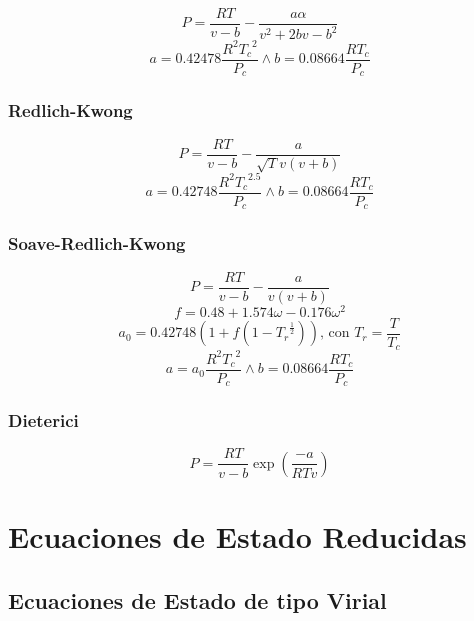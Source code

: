         \begin{equation}
            P=\frac{RT}{v-b} - \frac{a\alpha}{v^{2}+2bv-b^{2}}
        \end{equation}
        \[a=0.42478\frac{R^{2}{T_{c}}^{2}}{P_{c}}\wedge b=0.08664\frac{RT_{c}}{P_{c}}\]
        
        \subsubsection{Redlich-Kwong}
        
        \begin{equation}
            P=\frac{RT}{v-b} - \frac{a}{\sqrt{T}v(v+b)}
        \end{equation}
        \[a=0.42748\frac{R^{2}{T_{c}}^{2.5}}{P_{c}} \wedge b=0.08664\frac{RT_{c}}{P_{c}}\]
        
        \subsubsection{Soave-Redlich-Kwong}
        
        \begin{equation}
            P=\frac{RT}{v-b} - \frac{a}{v(v+b)}
        \end{equation}
        \[f=0.48+1.574\omega - 0.176 \omega^{2}\]
        \[a_{0}=0.42748\left ( 1 + f \left ( 1-{T_{r}}^{\frac{1}{2}} \right ) \right ) \text{, con }T_{r}=\frac{T}{T_{c}}\]
        \[a=a_{0}\frac{R^{2}{T_{c}}^{2}}{P_{c}} \wedge b=0.08664\frac{RT_{c}}{P_{c}}\]
        
        \subsubsection{Dieterici}
        
        \begin{equation}
            P=\frac{RT}{v-b}\exp(\frac{-a}{RTv})
        \end{equation}
    
\section{Ecuaciones de Estado Reducidas}

    \subsection{Ecuaciones de Estado de tipo Virial}
    
